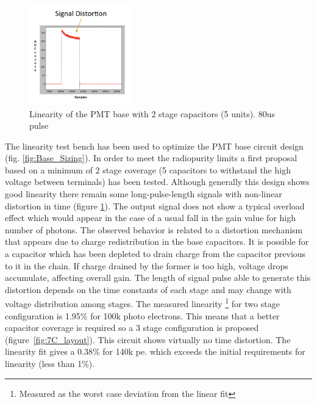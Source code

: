\documentclass[a4paper, 10pt, oneside, twocolumn, 3p]{elsarticle}
\begin{document}
\begin{figure}
  \begin{center}
    \includegraphics[width=0.4\textwidth]{./figures/5C_base.png}
    \caption{Linearity of the PMT base with 2 stage capacitors (5 units). 80us pulse}
    \label{fig:5C}
  \end{center}
\end{figure}

\par The linearity test bench has been used to optimize the PMT base circuit design (fig. \ref{fig:Base_Sizing}). In order to meet the radiopurity limits \cite{1029-8479} a first proposal based on a minimum of 2 stage coverage (5 capacitors to withstand the high voltage between terminals) has been tested. Although generally this design shows good linearity there remain some long-pulse-length signals with non-linear distortion in time  (figure \ref{fig:5C}). The output signal does not show a typical overload effect which would appear in the case of a usual fall in the gain value for high number of photons. The observed behavior is related to a distortion mechanism that appears due to charge redistribution in the base capacitors. It is possible for a capacitor which has been depleted to drain charge from the capacitor previous to it in the chain. If charge drained by the former is too high, voltage drops accumulate, affecting overall gain. The length of signal pulse able to generate this distortion depends on the time constants of each stage and may change with voltage distribution among stages. The measured linearity  \footnote{Measured as the worst case deviation from the linear fit} for two stage configuration is 1.95\% for 100k photo electrons. This means that a better capacitor coverage is required so a 3 stage configuration is proposed (figure~\ref{fig:7C_layout}). This circuit shows virtually no time distortion. The linearity fit gives a 0.38\% for 140k pe. which exceeds the initial requirements for linearity (less than 1\%).
\end{document}
